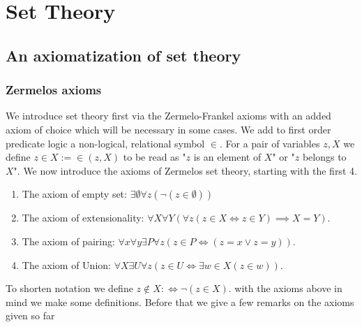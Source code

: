 \section{Set Theory}
\subsection{An axiomatization of set theory}
\subsubsection{Zermelos axioms}

We introduce set theory first via the Zermelo-Frankel axioms with an added axiom of choice which will be necessary in some cases. We add to first order predicate logic a non-logical, relational symbol $\in$. For a pair of variables $z,X$ we define $z\in X :=  \in(z,X)$ to be read as "$z$ is an element of $X$" or "$z$ belongs to $X$". We now introduce the axioms of Zermelos set theory, starting with the first 4. 
\begin{axioms}
    \begin{enumerate}\addtocounter{enumi}{-1}
        \item The axiom of empty set: $\exists \emptyset\forall z(\neg(z\in \emptyset))$
        \item The axiom of extensionality: $\forall X\forall Y(\forall z(z\in X \iff z \in Y)\implies X=Y)$.
        \item The axiom of pairing: $\forall x\forall y\exists P \forall z\left(z\in P \iff \left(z = x \vee z = y\right)\right)$.
        \item The axiom of Union: $\forall X\exists U \forall z ( z \in U \iff \exists w \in X(z\in w))$.
    \end{enumerate}
\end{axioms}
To shorten notation we define $z\notin X :\iff \neg(z\in X)$. with the axioms above in mind we make some definitions. Before that we give a few remarks on the axioms given so far
